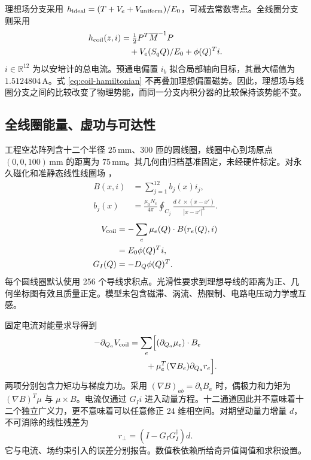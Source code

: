 理想场分支采用 $h_{\rm ideal}=(T+V_e+V_{\rm uniform})/E_0$，可减去常数零点。全线圈分支则采用
\begin{equation}
\begin{aligned}
 h_{\rm coil}(z,i)&=\tfrac12P^T\overline M^{-1}P\\
 &\quad+V_e(S_qQ)/E_0+\phi(Q)^Ti.
\end{aligned}
 \label{eq:coil-hamiltonian}
\end{equation}
$i\in\mathbb R^{12}$ 为以安培计的总电流。预通电偏置 $i_b$ 拟合局部轴向目标，其最大幅值为 $1.5124804$\,A。式 \eqref{eq:coil-hamiltonian} 不再叠加理想偏置磁势。因此，理想场与线圈分支之间的比较改变了物理势能，而同一分支内积分器的比较保持该势能不变。

\subsection{全线圈能量、虚功与可达性}
工程空芯阵列含十二个半径 $25$\,mm、300 匝的圆线圈，线圈中心到场原点 $(0,0,100)$\,mm 的距离为 $75$\,mm。其几何由归档基准固定，未经硬件标定。对永久磁化和准静态线性线圈场 \citep{Abbott2020}，
\begin{equation}
\begin{aligned}
 B(x,i)&=\sum_{j=1}^{12}b_j(x)i_j,\\
 b_j(x)&=\frac{\mu_0N_c}{4\pi}\oint_{C_j}
 \frac{d\ell\times(x-x')}{|x-x'|^3}.
\end{aligned}
 \label{eq:coil-field}
\end{equation}
\begin{equation}
\begin{aligned}
 V_{\rm coil}&=-\sum_e\mu_e(Q)\cdot B(r_e(Q),i)\\
 &=E_0\phi(Q)^Ti,\\
 G_I(Q)&=-D_Q\phi(Q)^T.
\end{aligned}
 \label{eq:current-port}
\end{equation}
每个圆线圈默认使用 256 个导线求积点。光滑性要求到理想导线的距离为正、几何坐标图有效且质量正定。模型未包含磁滞、涡流、热限制、电路电压动力学或互感。

固定电流对能量求导得到
\begin{equation}
\begin{aligned}
 -\partial_{Q_a}V_{\rm coil}
 &=\sum_e\Bigl[(\partial_{Q_a}\mu_e)\cdot B_e\\
 &\qquad+\mu_e^T(\nabla B_e)\partial_{Q_a}r_e\Bigr].
\end{aligned}
 \label{eq:magnetic-virtual-work}
\end{equation}
两项分别包含力矩功与梯度力功。采用 $(\nabla B)_{ab}=\partial_b B_a$ 时，偶极力和力矩为 $(\nabla B)^T\mu$ 与 $\mu\times B$。电流仅通过 $G_Ii$ 进入动量方程。十二通道因此并不意味着十二个独立广义力，更不意味着可以任意修正 24 维相空间。对期望动量力增量 $d$，不可消除的线性残差为
\begin{equation}
 r_\perp=(I-G_IG_I^\dagger)d.
 \label{eq:unreachable-force}
\end{equation}
它与电流、场约束引入的误差分别报告。数值秩依赖所给奇异值阈值和求积设置。

